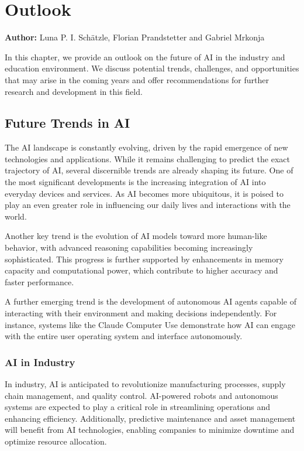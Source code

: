 \chapter{Outlook}
\label{chap:Outlook}
\textbf{Author:} Luna P. I. Schätzle, Florian Prandstetter and Gabriel Mrkonja

In this chapter, we provide an outlook on the future of AI in the industry and education environment. We discuss potential trends, challenges, and opportunities that may arise in the coming years and offer recommendations for further research and development in this field.

\section{Future Trends in AI}

The AI landscape is constantly evolving, driven by the rapid emergence of new technologies and applications. While it remains challenging to predict the exact trajectory of AI, several discernible trends are already shaping its future. One of the most significant developments is the increasing integration of AI into everyday devices and services. As AI becomes more ubiquitous, it is poised to play an even greater role in influencing our daily lives and interactions with the world.

Another key trend is the evolution of AI models toward more human-like behavior, with advanced reasoning capabilities becoming increasingly sophisticated. This progress is further supported by enhancements in memory capacity and computational power, which contribute to higher accuracy and faster performance.

A further emerging trend is the development of autonomous AI agents capable of interacting with their environment and making decisions independently. For instance, systems like the Claude Computer Use demonstrate how AI can engage with the entire user operating system and interface autonomously.\cite{Claude-Computer-use}

\subsection{AI in Industry}

In industry, AI is anticipated to revolutionize manufacturing processes, supply chain management, and quality control. AI-powered robots and autonomous systems are expected to play a critical role in streamlining operations and enhancing efficiency. Additionally, predictive maintenance and asset management will benefit from AI technologies, enabling companies to minimize downtime and optimize resource allocation.


